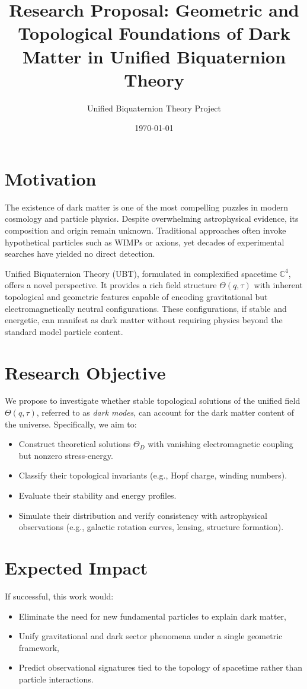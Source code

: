 \documentclass[12pt]{article}
\title{Research Proposal: Geometric and Topological Foundations of Dark Matter in Unified Biquaternion Theory}
\author{Unified Biquaternion Theory Project}
\date{\today}
\begin{document}
\maketitle

\section*{Motivation}
The existence of dark matter is one of the most compelling puzzles in modern cosmology and particle physics. Despite overwhelming astrophysical evidence, its composition and origin remain unknown. Traditional approaches often invoke hypothetical particles such as WIMPs or axions, yet decades of experimental searches have yielded no direct detection.

Unified Biquaternion Theory (UBT), formulated in complexified spacetime \( \mathbb{C}^4 \), offers a novel perspective. It provides a rich field structure \( \Theta(q, \tau) \) with inherent topological and geometric features capable of encoding gravitational but electromagnetically neutral configurations. These configurations, if stable and energetic, can manifest as dark matter without requiring physics beyond the standard model particle content.

\section*{Research Objective}
We propose to investigate whether stable topological solutions of the unified field \( \Theta(q, \tau) \), referred to as \emph{dark modes}, can account for the dark matter content of the universe. Specifically, we aim to:

\begin{itemize}
  \item Construct theoretical solutions \( \Theta_D \) with vanishing electromagnetic coupling but nonzero stress-energy.
  \item Classify their topological invariants (e.g., Hopf charge, winding numbers).
  \item Evaluate their stability and energy profiles.
  \item Simulate their distribution and verify consistency with astrophysical observations (e.g., galactic rotation curves, lensing, structure formation).
\end{itemize}

\section*{Expected Impact}
If successful, this work would:
\begin{itemize}
  \item Eliminate the need for new fundamental particles to explain dark matter,
  \item Unify gravitational and dark sector phenomena under a single geometric framework,
  \item Predict observational signatures tied to the topology of spacetime rather than particle interactions.
\end{itemize}
\end{document}
